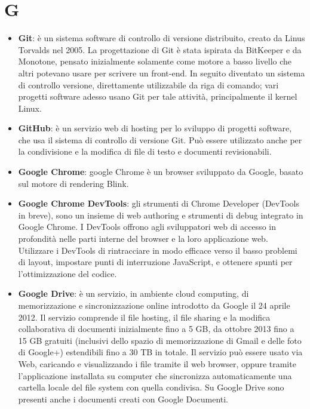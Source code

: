 \section{G}
\begin{itemize}
	\item
	\textbf{Git}: è un sistema software di controllo di versione distribuito, creato da Linus Torvalds nel 2005.
	La progettazione di Git è stata ispirata da BitKeeper e da Monotone, pensato 	inizialmente solamente come motore a basso livello che altri potevano usare per scrivere un front-end. In seguito diventato un sistema di controllo versione, direttamente utilizzabile da riga di comando; vari progetti software adesso usano Git per tale attività, principalmente il kernel Linux.
	\item
	\textbf{GitHub}: è un servizio web di hosting per lo sviluppo di progetti software, che usa il sistema di controllo di versione Git. Può essere utilizzato anche per la condivisione e la modifica di file di testo e documenti revisionabili. 
	\item
	\textbf{Google Chrome}: google Chrome è un browser sviluppato da Google, basato sul motore di rendering Blink.
	\item
	\textbf{Google Chrome DevTools}: gli strumenti di Chrome Developer (DevTools in breve), sono un insieme di web authoring e strumenti di debug integrato in Google Chrome. I DevTools offrono agli sviluppatori web di accesso in profondità nelle parti interne del browser e la loro applicazione web. Utilizzare i DevTools di rintracciare in modo efficace verso il basso problemi di layout, impostare punti di interruzione JavaScript, e ottenere spunti per l'ottimizzazione del codice.
	\item
	\textbf{Google Drive}: è un servizio, in ambiente cloud computing, di memorizzazione e sincronizzazione online introdotto da Google il 24 aprile 2012. Il servizio comprende il file hosting, il file sharing e la modifica collaborativa di documenti inizialmente fino a 5 GB, da ottobre 2013 fino a 15 GB gratuiti (inclusivi dello spazio di memorizzazione di Gmail e delle foto di Google+) estendibili fino a 30 TB in totale. Il servizio può essere usato via Web, caricando e visualizzando i file tramite il web browser, oppure tramite l'applicazione installata su computer che sincronizza automaticamente una cartella locale del file system con quella condivisa. Su Google Drive sono presenti anche i documenti creati con Google Documenti.
\end{itemize}
